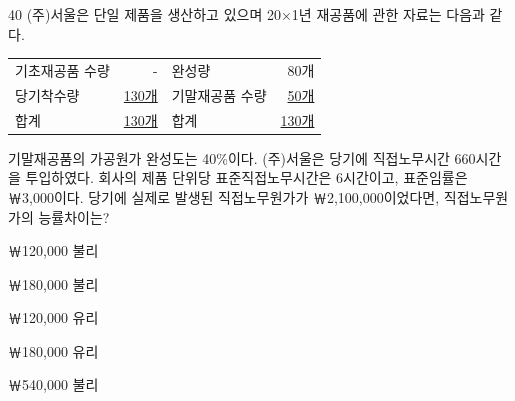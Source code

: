 \begin{question}{40}
(주)서울은 단일 제품을 생산하고 있으며 20×1년 재공품에 관한 자료는 다음과 같다.

{\small\centering
\begin{tabular}{lr|lr}
\hline
기초재공품 수량 & - & 완성량 & 80개 \\
당기착수량 & \uline{130개} & 기말재공품 수량 & \uline{50개} \\
합계 & \uline{130개} & 합계 & \uline{130개} \\
\hline
\end{tabular}\par}

기말재공품의 가공원가 완성도는 40\%이다. (주)서울은 당기에 직접노무시간 660시간을 투입하였다. 회사의 제품 단위당 표준직접노무시간은 6시간이고, 표준임률은 ￦3,000이다. 당기에 실제로 발생된 직접노무원가가 ￦2,100,000이었다면, 직접노무원가의 능률차이는? \par
\begin{choices}
  \item ￦120,000 불리
  \item ￦180,000 불리
  \item ￦120,000 유리
  \item ￦180,000 유리
  \item ￦540,000 불리
\end{choices}
\end{question}
